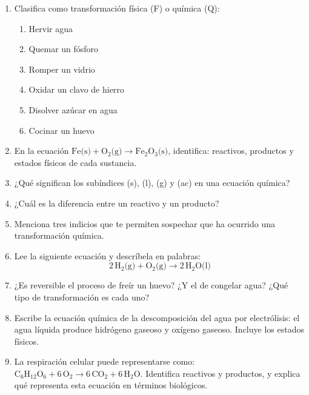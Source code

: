 \documentclass[12pt, a4paper]{article}
\begin{document}
\begin{enumerate}[leftmargin=*, resume]
  \item \facil{} Clasifica como transformación física (F) o química (Q):
  \begin{enumerate}[label=\alph*)]
    \item Hervir agua
    \item Quemar un fósforo
    \item Romper un vidrio
    \item Oxidar un clavo de hierro
    \item Disolver azúcar en agua
    \item Cocinar un huevo
  \end{enumerate}

  \item \facil{} En la ecuación $\text{Fe(s)} + \text{O}_2\text{(g)} \rightarrow \text{Fe}_2\text{O}_3\text{(s)}$, identifica: reactivos, productos y estados físicos de cada sustancia.

  \item \facil{} ¿Qué significan los subíndices (s), (l), (g) y (ac) en una ecuación química?

  \item \facil{} ¿Cuál es la diferencia entre un reactivo y un producto?

  \item \medio{} Menciona tres indicios que te permiten sospechar que ha ocurrido una transformación química.

  \item \medio{} Lee la siguiente ecuación y descríbela en palabras:
  $$2\,\text{H}_2\text{(g)} + \text{O}_2\text{(g)} \rightarrow 2\,\text{H}_2\text{O(l)}$$

  \item \medio{} ¿Es reversible el proceso de freír un huevo? ¿Y el de congelar agua? ¿Qué tipo de transformación es cada uno?

  \item \medio{} Escribe la ecuación química de la descomposición del agua por electrólisis: el agua líquida produce hidrógeno gaseoso y oxígeno gaseoso. Incluye los estados físicos.

  \item \dificil{} La respiración celular puede representarse como: $\text{C}_6\text{H}_{12}\text{O}_6 + 6\,\text{O}_2 \rightarrow 6\,\text{CO}_2 + 6\,\text{H}_2\text{O}$. Identifica reactivos y productos, y explica qué representa esta ecuación en términos biológicos.


\end{enumerate}
\end{document}

